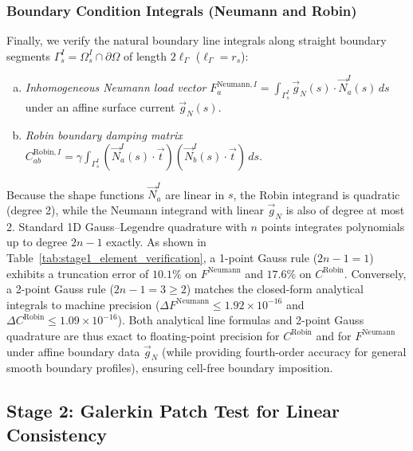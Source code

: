 \documentclass[VANCOUVER,Times1COL]{WileyNJD-v5}
\begin{document}
\subsubsection{Boundary Condition Integrals (Neumann and Robin)}
Finally, we verify the natural boundary line integrals along straight boundary segments $\Gamma_s^I = \Omega_s^I \cap \partial\Omega$ of length $2\ell_{\Gamma}$ ($\ell_{\Gamma} = r_s$):
\begin{enumerate}[(a)]
    \item \textit{Inhomogeneous Neumann load vector} $F_a^{\mathrm{Neumann}, I} = \int_{\Gamma_s^I} \vec{g}_N(s) \cdot \vec{N}_a^I(s) \, ds$ under an affine surface current $\vec{g}_N(s)$.
    \item \textit{Robin boundary damping matrix} $C_{ab}^{\mathrm{Robin}, I} = \gamma \int_{\Gamma_s^I} (\vec{N}_a^I(s) \cdot \vec{t})(\vec{N}_b^I(s) \cdot \vec{t}) \, ds$.
\end{enumerate}
Because the shape functions $\vec{N}_a^I$ are linear in $s$, the Robin integrand is quadratic (degree 2), while the Neumann integrand with linear $\vec{g}_N$ is also of degree at most 2. Standard 1D Gauss--Legendre quadrature with $n$ points integrates polynomials up to degree $2n - 1$ exactly. As shown in Table~\ref{tab:stage1_element_verification}, a 1-point Gauss rule ($2n-1 = 1$) exhibits a truncation error of $10.1\%$ on $F^{\mathrm{Neumann}}$ and $17.6\%$ on $C^{\mathrm{Robin}}$. Conversely, a 2-point Gauss rule ($2n-1 = 3 \ge 2$) matches the closed-form analytical integrals to machine precision ($\Delta F^{\mathrm{Neumann}} \le 1.92 \times 10^{-16}$ and $\Delta C^{\mathrm{Robin}} \le 1.09 \times 10^{-16}$). Both analytical line formulas and 2-point Gauss quadrature are thus exact to floating-point precision for $C^{\mathrm{Robin}}$ and for $F^{\mathrm{Neumann}}$ under affine boundary data $\vec{g}_N$ (while providing fourth-order accuracy for general smooth boundary profiles), ensuring cell-free boundary imposition.

\subsection{Stage 2: Galerkin Patch Test for Linear Consistency}
\label{subsec:stage2_patch_test}
\end{document}
